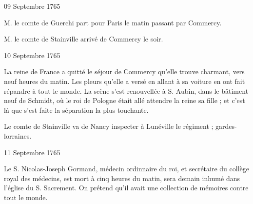                      \begin{diary}{09 Septembre 1765}{}


                           M. le comte de Guerchi part pour
                              Paris le
                           matin passant par Commercy. \bigskip



                           M. le comte de Stainville arrivé
                           de Commercy
                           le soir. \bigskip


                     \end{diary}

                     \begin{diary}{10 Septembre 1765}{}


                           La reine de France a
                           quitté le séjour de
                           Commercy qu'elle trouve
                           charmant, vers
                           neuf heures du matin. Les pleurs qu'elle
                           a versé en allant à sa voiture en ont fait
                           répandre à tout le monde. La scène s'est
                           renouvellée à S. Aubin, dans
                           le bâtiment
                           neuf de Schmidt, où le roi de Pologne était allé
                           attendre la reine sa
                              fille ; et c'est là que
                           s'est faite la séparation la plus touchante. \bigskip



                           Le comte de Stainville va de
                              Nancy inspecter
                           à Lunéville
                           le régiment ; gardes-lorraines. \bigskip


                     \end{diary}

                     \begin{diary}{11 Septembre 1765}{}


                           Le S. Nicolas-Joseph Gormand,
                           médecin ordinnaire
                           du roi, et secrétaire du collège royal des médecins,
                           est mort à cinq heures du matin, sera
                           demain inhumé dans l’église du S. Sacrement.
                           On prétend qu'il avait une collection de
                           mémoires contre tout le monde. \bigskip


                     \end{diary}

